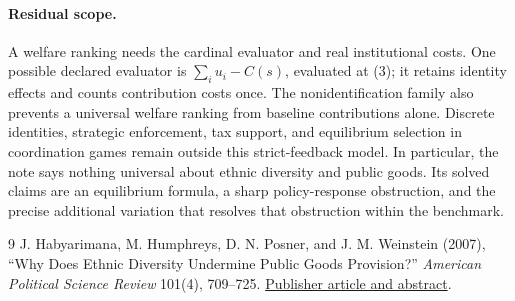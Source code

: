 \documentclass[11pt]{article}
\theoremstyle{definition}
\begin{document}
\paragraph{Residual scope.}
A welfare ranking needs the cardinal evaluator and real institutional costs. One possible declared evaluator is $\sum_i u_i-C(s)$, evaluated at (3); it retains identity effects and counts contribution costs once. The nonidentification family also prevents a universal welfare ranking from baseline contributions alone. Discrete identities, strategic enforcement, tax support, and equilibrium selection in coordination games remain outside this strict-feedback model. In particular, the note says nothing universal about ethnic diversity and public goods. Its solved claims are an equilibrium formula, a sharp policy-response obstruction, and the precise additional variation that resolves that obstruction within the benchmark.

\begin{thebibliography}{9}
 J. Habyarimana, M. Humphreys, D. N. Posner, and J. M. Weinstein (2007), ``Why Does Ethnic Diversity Undermine Public Goods Provision?'' \emph{American Political Science Review} 101(4), 709--725. \href{https://www.cambridge.org/core/journals/american-political-science-review/article/abs/why-does-ethnic-diversity-undermine-public-goods-provision/36C285D07DC0DE604BFC123F53060DF6}{Publisher article and abstract}.
\end{thebibliography}
\end{document}
